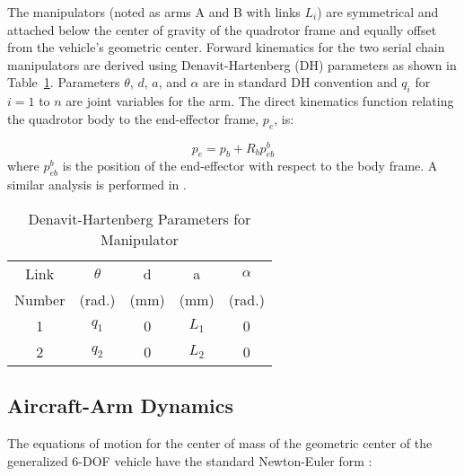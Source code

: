 The manipulators (noted as arms A and B with links $L_i$) are symmetrical and attached below the center of gravity of the quadrotor frame and equally offset from the vehicle's geometric center. Forward kinematics for the two serial chain manipulators are derived using Denavit-Hartenberg (DH) parameters as shown in Table~\ref{tab:DHParameters}. Parameters $\theta$, $d$, $a$, and $\alpha$ are in standard DH convention and  $q_i$ for $i = 1$ to $n$ are joint variables for the arm. The direct kinematics function relating the quadrotor body to the end-effector frame, $p_e$, is:

\begin{equation}
	p_e = p_b + R_bp^b_{eb}
\end{equation}
where $p^b_{eb}$ is the position of the end-effector with respect to the body frame. A similar analysis is performed in \cite{Arleo2013}.

\begin{table}
	\renewcommand{\arraystretch}{1.3}
	\caption{Denavit-Hartenberg Parameters for Manipulator}
	\label{tab:DHParameters}
	\centering
	\begin{tabular}{|c||c|c|c|c|}
	\hline
	Link & $\theta$ & d & a & $\alpha$\\
	Number & (rad.) & (mm) & (mm) & (rad.)\\
	\hline
	\hline 
	1 & $q_1$ & 0   & $L_1$ & 0\\
	2 & $q_2$ & 0   & $L_2$ & 0\\
	\hline
	\end{tabular}
\end{table}

\subsection{Aircraft-Arm Dynamics}

The equations of motion for the center of mass of the geometric center of the generalized 6-DOF vehicle have the standard Newton-Euler form \cite{Bouabdallah2004}:

